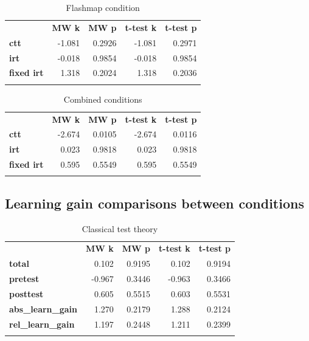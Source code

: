 \begin{longtable}[c]{@{}lrrrr@{}}
\caption{Flashmap condition}
\endfirsthead
\endhead
\toprule\addlinespace
& \textbf{MW k} & \textbf{MW p} &
\textbf{t-test k} & \textbf{t-test p}
\\\addlinespace
\midrule
\textbf{ctt} & -1.081 & 0.2926 & -1.081 & 0.2971
\\\addlinespace
\textbf{irt} & -0.018 & 0.9854 & -0.018 & 0.9854
\\\addlinespace
\textbf{fixed irt} & 1.318 & 0.2024 & 1.318 & 0.2036
\\\addlinespace
\bottomrule
    \label{tab:comp_pp_fm_comp}
\end{longtable}

\begin{longtable}[c]{@{}lrrrr@{}}
\caption{Combined conditions}
\endfirsthead
\endhead
\toprule\addlinespace
& \textbf{MW k} & \textbf{MW p} &
\textbf{t-test k} & \textbf{t-test p}
\\\addlinespace
\midrule
\textbf{ctt} & -2.674 & 0.0105 & -2.674 & 0.0116
\\\addlinespace
\textbf{irt} & 0.023 & 0.9818 & 0.023 & 0.9818
\\\addlinespace
\textbf{fixed irt} & 0.595 & 0.5549 & 0.595 & 0.5549
\\\addlinespace
\bottomrule
    \label{tab:comp_pp_gen_comp}
\end{longtable}

\FloatBarrier
\subsection{Learning gain comparisons between conditions}

\begin{longtable}[c]{@{}lrrrr@{}}
\caption{Classical test theory}
\endfirsthead
\endhead
\toprule\addlinespace
& \textbf{MW k} & \textbf{MW p} &
\textbf{t-test k} & \textbf{t-test p}
\\\addlinespace
\midrule
\textbf{total} & 0.102 & 0.9195 & 0.102 & 0.9194
\\\addlinespace
\textbf{pretest} & -0.967 & 0.3446 & -0.963 & 0.3466
\\\addlinespace
\textbf{posttest} & 0.605 & 0.5515 & 0.603 & 0.5531
\\\addlinespace
\textbf{abs\_learn\_gain} & 1.270 & 0.2179 & 1.288 & 0.2124
\\\addlinespace
\textbf{rel\_learn\_gain} & 1.197 & 0.2448 & 1.211 & 0.2399
\\\addlinespace
\bottomrule
    \label{tab:comp_cond_ctt_comp}
\end{longtable}

